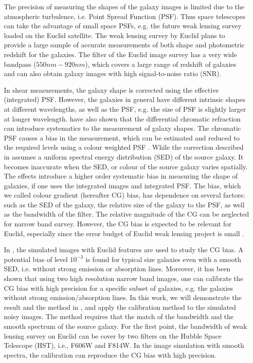 \documentclass[useAMS,usenatbib]{mn2e}
\begin{document}
The precision of measuring the shapes of the galaxy images is limited
due to the atmospheric turbulence, i.e. Point Spread Function
(PSF). Thus space telescopes can take the advantage of small space
PSFs, e.g. the future weak lensing survey loaded on the Euclid
satellite. The weak lensing survey by Euclid plans to provide a large
sample of accurate measurements of both shape and photometric redshift
for the galaxies. The filter of the Euclid image survey has a very wide
bandpass ($550nm-920nm$), which covers a large range of redshift of
galaxies and can also obtain galaxy images with high signal-to-noise
ratio (SNR).

In shear measurements, the galaxy shape is corrected using the
effective (integrated) PSF. However, the galaxies in general have
different intrinsic shapes at different wavelengths, as well as the
PSF, e.g. the size of PSF is slightly larger at longer wavelength.
\citep{2015ApJ...807..182M} have also shown that the differential
chromatic refraction can introduce systematics to the measurement of
galaxy shapes.  The chromatic PSF causes a bias in the measurement,
which can be estimated and reduced to the required levels using a
colour weighted PSF \citep{2010MNRAS.405..494C}. While the correction
described in \citet{2010MNRAS.405..494C} assumes a uniform spectral
energy distribution (SED) of the source galaxy. It becomes inaccurate
when the SED, or colour of the source galaxy varies spatially.  The
effects introduce a higher order systematic bias in measuring the
shape of galaxies, if one uses the integrated images and integrated
PSF. The bias, which we called colour gradient (hereafter CG) bias,
has dependence on several factors: such as the SED of the galaxy, the
relative size of the galaxy to the PSF, as well as the bandwidth of
the filter. The relative magnitude of the CG can be neglected for
narrow band survey. However, the CG bias is expected to be relevant
for Euclid, especially since the error budget of Euclid weak lensing project
is small \citep[e.g.][]{2013MNRAS.431.3103C,2013MNRAS.429..661M}.

In \citep{2012MNRAS.421.1385V, 2013MNRAS.432.2385S}, the simulated
images with Euclid features are used to study the CG bias. A potential
bias of level $10^{-3}$ is found for typical size galaxies even with a
smooth SED, i.e. without strong emission or absorption lines.
Moreover, it has been shown that using two high resolution narrow
band images, one can calibrate the CG bias with high precision for a
specific subset of galaxies, e.g. the galaxies without strong
emission/absorption lines. In this work, we will demonstrate the
result and the method in \citet{2013MNRAS.432.2385S}, and apply the
calibration method to the simulated noisy images. The method requires
that the match of the bandwidth and the smooth spectrum of the source
galaxy. For the first point, the bandwidth of weak lensing survey on
Euclid can be cover by two filters on the Hubble Space Telescope
(HST), i.e., F606W and F814W. In the image simulation with smooth
spectra, the calibration can reproduce the CG bias with high
precision.
\end{document}
